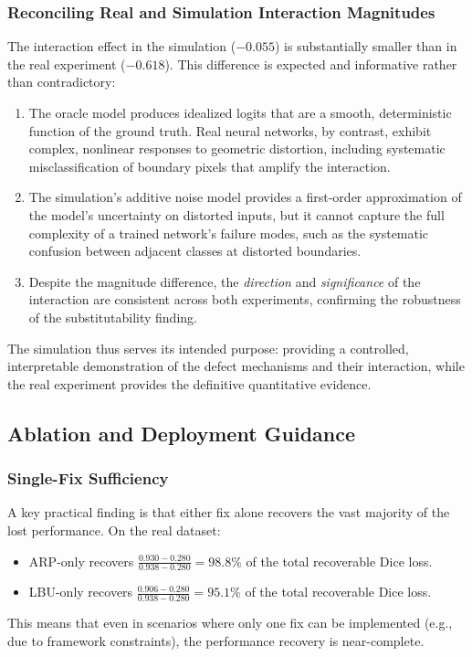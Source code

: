 \documentclass[10pt,twocolumn]{article}
\begin{document}
\subsubsection{Reconciling Real and Simulation Interaction Magnitudes}

The interaction effect in the simulation ($-0.055$) is substantially smaller than in the real experiment ($-0.618$).
This difference is expected and informative rather than contradictory:

\begin{enumerate}[leftmargin=*]
    \item The oracle model produces idealized logits that are a smooth, deterministic function of the ground truth. Real neural networks, by contrast, exhibit complex, nonlinear responses to geometric distortion, including systematic misclassification of boundary pixels that amplify the interaction.
    \item The simulation's additive noise model provides a first-order approximation of the model's uncertainty on distorted inputs, but it cannot capture the full complexity of a trained network's failure modes, such as the systematic confusion between adjacent classes at distorted boundaries.
    \item Despite the magnitude difference, the \emph{direction} and \emph{significance} of the interaction are consistent across both experiments, confirming the robustness of the substitutability finding.
\end{enumerate}

The simulation thus serves its intended purpose: providing a controlled, interpretable demonstration of the defect mechanisms and their interaction, while the real experiment provides the definitive quantitative evidence.

\subsection{Ablation and Deployment Guidance}
\label{sec:ablation}

\subsubsection{Single-Fix Sufficiency}

A key practical finding is that either fix alone recovers the vast majority of the lost performance.
On the real dataset:
\begin{itemize}[leftmargin=*]
    \item ARP-only recovers $\frac{0.930 - 0.280}{0.938 - 0.280} = 98.8\%$ of the total recoverable Dice loss.
    \item LBU-only recovers $\frac{0.906 - 0.280}{0.938 - 0.280} = 95.1\%$ of the total recoverable Dice loss.
\end{itemize}
This means that even in scenarios where only one fix can be implemented (e.g., due to framework constraints), the performance recovery is near-complete.
\end{document}

